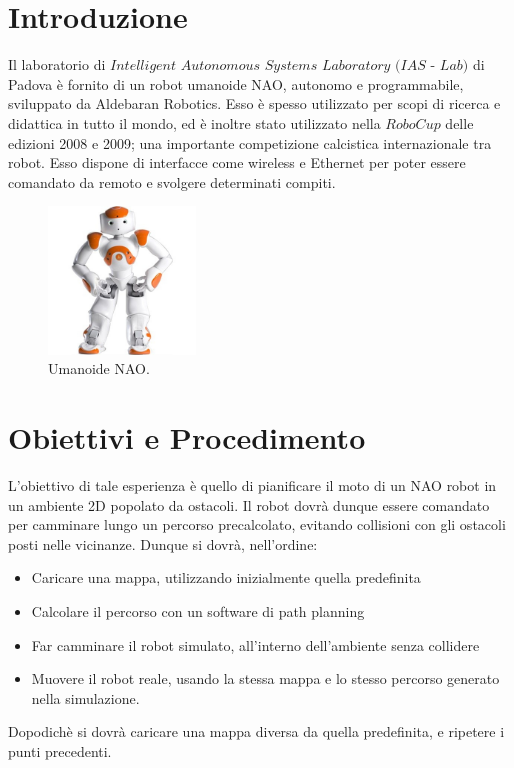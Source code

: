 \documentclass[english]{article}
\begin{document}
\tableofcontents
\newpage

\section{Introduzione} 
Il laboratorio di $Intelligent$ $Autonomous$ $Systems$ $Laboratory$ $(IAS$ - $Lab)$ di Padova è fornito di un robot umanoide NAO, autonomo e programmabile, sviluppato da Aldebaran Robotics. Esso è spesso utilizzato per scopi di ricerca e didattica in tutto il mondo, ed è inoltre stato utilizzato nella $RoboCup$ delle edizioni 2008 e 2009; una importante competizione calcistica internazionale tra robot. Esso dispone di interfacce come wireless e Ethernet per poter essere comandato da remoto e svolgere determinati compiti.

\begin{figure}[!h]
\centering
\includegraphics[width=0.35\textwidth]{nao}
\caption{Umanoide NAO.}
\label{fig:ur10}
\end{figure}

\section{Obiettivi e Procedimento}
L'obiettivo di tale esperienza è quello di pianificare il moto di un NAO robot in un ambiente 2D popolato da ostacoli. Il robot dovrà dunque essere comandato per camminare lungo un percorso precalcolato, evitando collisioni con gli ostacoli posti nelle vicinanze. Dunque si dovrà, nell'ordine:
\begin{itemize}
\item Caricare una mappa, utilizzando inizialmente quella predefinita
\item Calcolare il percorso con un software di path planning
\item Far camminare il robot simulato, all'interno dell'ambiente senza collidere
\item Muovere il robot reale, usando la stessa mappa e lo stesso percorso generato nella simulazione.
\end{itemize}
Dopodichè si dovrà caricare una mappa diversa da quella predefinita, e ripetere i punti precedenti. 
\end{document}
